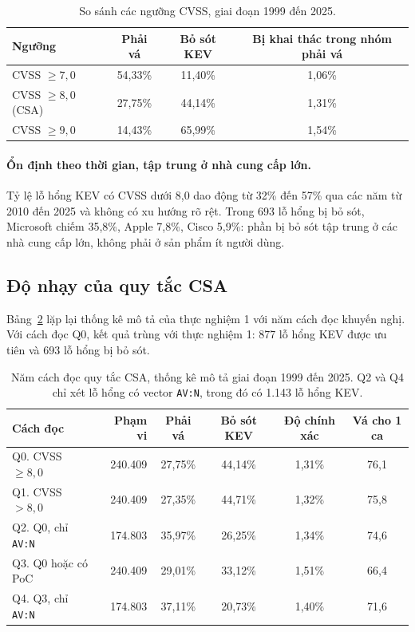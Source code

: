 \documentclass[runningheads]{llncs}
\begin{document}
\begin{table}
\centering
\caption{So sánh các ngưỡng CVSS, giai đoạn 1999 đến 2025.}\label{tab:nguong}
\begin{tabular}{lccc}
\toprule
Ngưỡng & \quad Phải vá\quad & \quad Bỏ sót KEV\quad & Bị khai thác trong nhóm phải vá \\
\midrule
CVSS $\ge 7{,}0$ & 54,33\% & 11,40\% & 1,06\% \\
CVSS $\ge 8{,}0$ (CSA) & 27,75\% & 44,14\% & 1,31\% \\
CVSS $\ge 9{,}0$ & 14,43\% & 65,99\% & 1,54\% \\
\bottomrule
\end{tabular}
\end{table}

\paragraph{Ổn định theo thời gian, tập trung ở nhà cung cấp lớn.} Tỷ lệ lỗ hổng KEV có CVSS dưới 8,0 dao
động từ 32\% đến 57\% qua các năm từ 2010 đến 2025 và không có xu hướng rõ rệt. Trong 693 lỗ hổng bị bỏ sót,
Microsoft chiếm 35,8\%, Apple 7,8\%, Cisco 5,9\%: phần bị bỏ sót tập trung ở các nhà cung cấp
lớn, không phải ở sản phẩm ít người dùng.

\subsection{Độ nhạy của quy tắc CSA}\label{sec:donhay}

Bảng~\ref{tab:donhay} lặp lại thống kê mô tả của thực nghiệm 1 với năm cách đọc khuyến nghị.
Với cách đọc Q0, kết quả trùng với thực nghiệm 1: 877 lỗ hổng KEV được ưu tiên và 693 lỗ hổng bị bỏ sót.

\begin{table}
\centering
\setlength{\tabcolsep}{4pt}
\caption{Năm cách đọc quy tắc CSA, thống kê mô tả giai đoạn 1999 đến 2025. Q2 và Q4 chỉ xét lỗ hổng có vector
\texttt{AV:N}, trong đó có 1.143 lỗ hổng KEV.}\label{tab:donhay}
\begin{tabular}{lrcccc}
\toprule
Cách đọc & Phạm vi & Phải vá & Bỏ sót KEV & Độ chính xác & Vá cho 1 ca \\
\midrule
Q0. CVSS $\ge 8{,}0$ & 240.409 & 27,75\% & 44,14\% & 1,31\% & 76,1 \\
Q1. CVSS $> 8{,}0$ & 240.409 & 27,35\% & 44,71\% & 1,32\% & 75,8 \\
Q2. Q0, chỉ \texttt{AV:N} & 174.803 & 35,97\% & 26,25\% & 1,34\% & 74,6 \\
Q3. Q0 hoặc có PoC & 240.409 & 29,01\% & 33,12\% & 1,51\% & 66,4 \\
Q4. Q3, chỉ \texttt{AV:N} & 174.803 & 37,11\% & 20,73\% & 1,40\% & 71,6 \\
\bottomrule
\end{tabular}
\end{table}
\end{document}
